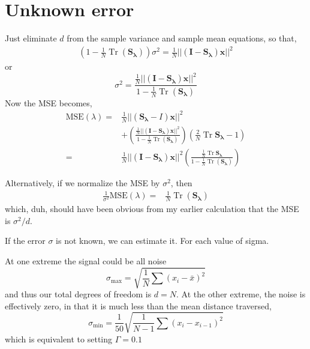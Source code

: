 \documentclass[10pt,journal]{IEEEtran}
\DeclareMathOperator{\Tr}{Tr}
\begin{document}
%
\section{Unknown error} \label{sec:unknown_error}
%

Just eliminate $d$ from the sample variance and sample mean equations, so that,
\begin{align}
    \left( 1 - \frac{1}{N} \Tr \left( \mathbf{S_\lambda} \right) \right) \sigma^2 =  \frac{1}{N} || \left( \mathbf{I} - \mathbf{S_\lambda} \right) \mathbf{x} ||^2
\end{align}
or
\begin{equation}
    \sigma^2 = \frac{ \frac{1}{N}|| \left( \mathbf{I} - \mathbf{S_\lambda} \right) \mathbf{x} ||^2}{1-\frac{1}{N}\Tr \left( \mathbf{S_\lambda} \right)}
\end{equation}
Now the MSE becomes,
\begin{align}
\nonumber
    \textrm{MSE}(\lambda) =& \frac{1}{N} || \left( \mathbf{S_\lambda} - I \right) \mathbf{x} ||^2 \\
    & + \left( \frac{\frac{1}{N}|| \left( \mathbf{I} - \mathbf{S_\lambda} \right) \mathbf{x} ||^2}{1-\frac{1}{N}\Tr \left( \mathbf{S_\lambda} \right)} \right) \left( \frac{2}{N} \Tr \mathbf{S_\lambda} -1 \right) \\
    =& \frac{1}{N}|| \left( \mathbf{I} - \mathbf{S_\lambda} \right) \mathbf{x} ||^2 \left( \frac{ \frac{1}{N} \Tr \mathbf{S_\lambda}}{1-\frac{1}{N}\Tr \left( \mathbf{S_\lambda} \right)} \right)
\end{align}

Alternatively, if we normalize the MSE by $\sigma^2$, then
\begin{align}
   \frac{1}{\sigma^2} \textrm{MSE}(\lambda) =& \frac{1}{N}\Tr \left( \mathbf{S_\lambda} \right)
\end{align}
which, duh, should have been obvious from my earlier calculation that the MSE is $\sigma^2/d$.

If the error $\sigma$ is not known, we can estimate it. For each value of sigma.

At one extreme the signal could be all noise
\begin{equation}
    \sigma_{\textrm{max}} = \sqrt{\frac{1}{N} \sum (x_i-\bar{x})^2}
\end{equation}
and thus our total degrees of freedom is $d=N$. At the other extreme, the noise is effectively zero, in that it is much less than the mean distance traversed,
\begin{equation}
    \sigma_{\textrm{min}} = \frac{1}{50} \sqrt{\frac{1}{N-1} \sum (x_i-x_{i-1})^2}
\end{equation}
which is equivalent to setting $\Gamma = 0.1$
\end{document}
